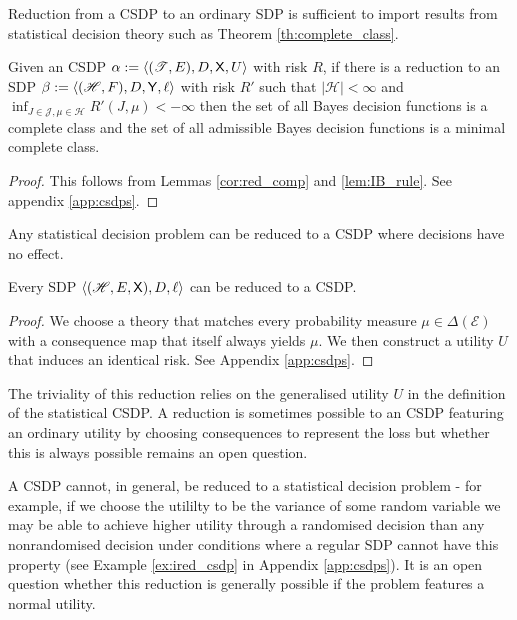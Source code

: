 
Reduction from a CSDP to an ordinary SDP is sufficient to import results from statistical decision theory such as Theorem \ref{th:complete_class}.


\begin{theorem}\label{th:complete_class}
Given an CSDP $\alpha:=\langle (\mathscr{T},E),D,\mathsf{X},U\rangle$ with risk $R$, if there is a reduction to an SDP $\beta:=\langle (\mathscr{H},F),D,\mathsf{Y},\ell \rangle$ with risk $R'$ such that $|\mathscr{H}|<\infty$ and $\inf_{J\in\mathscr{J},\mu\in\mathscr{H}} R'(J,\mu)<-\infty$ then the set of all Bayes decision functions is a complete class and the set of all admissible Bayes decision functions is a minimal complete class.
\end{theorem}

\begin{proof}
This follows from Lemmas \ref{cor:red_comp} and \ref{lem:IB_rule}. See appendix \ref{app:csdps}.
\end{proof}


Any statistical decision problem can be reduced to a CSDP where decisions have no effect.

\begin{theorem}\label{th:sdp_to_CSDP}
Every SDP $\langle (\mathscr{H},E,\mathsf{X}),D,\ell\rangle$ can be reduced to a CSDP.
\end{theorem}
\begin{proof}
We choose a theory that matches every probability measure $\mu\in\Delta(\mathcal{E})$ with a consequence map that itself always yields $\mu$. We then construct a utility $U$ that induces an identical risk. See Appendix \ref{app:csdps}.
\end{proof}

The triviality of this reduction relies on the generalised utility $U$ in the definition of the statistical CSDP. A reduction is sometimes possible to an CSDP featuring an ordinary utility by choosing consequences to represent the loss but whether this is always possible remains an open question.

A CSDP cannot, in general, be reduced to a statistical decision problem - for example, if we choose the utililty to be the variance of some random variable we may be able to achieve higher utility through a randomised decision than any nonrandomised decision under conditions where a regular SDP cannot have this property (see Example \ref{ex:ired_csdp} in Appendix \ref{app:csdps}). It is an open question whether this reduction is generally possible if the problem features a normal utility.

